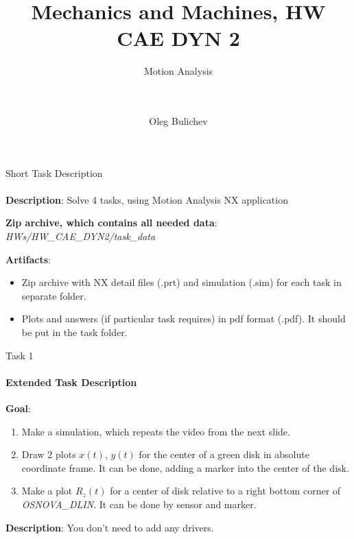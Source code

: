 \documentclass[aspectratio=169]{beamer}
\title[MaM]{Mechanics and Machines, HW CAE DYN 2} %
\subtitle{Motion Analysis
\\ \  \\ \ 
         } %
\author{Oleg Bulichev}
\newcommand{\fbckg}[1]{\usebackgroundtemplate{\texttt{[image: \#1]}}}%
\begin{document}
\setlength{\abovedisplayskip}{0pt}
\setlength{\belowdisplayskip}{0pt}
\setlength{\abovedisplayshortskip}{0pt}
\setlength{\belowdisplayshortskip}{0pt}

\fbckg{fibeamer/figs/title_page.png}

\fbckg{fibeamer/figs/common.png}

\note{\scriptsize \begin{itemize}
        \item \
    \end{itemize}}

\note{
    \
}

\begin{frame}[t]{Short Task Description}
    \framesubtitle{}
    \textbf{Description}: Solve 4 tasks, using Motion Analysis NX application

    \textbf{Zip archive, which contains all needed data}: \textit{HWs/HW\_CAE\_DYN2/task\_data}

    \textbf{Artifacts}:
    \begin{itemize}
        \item Zip archive with NX detail files (.prt) and simulation (.sim) for each task in separate folder.
        \item Plots and answers (if particular task requires) in pdf format (.pdf). It should be put in the task folder.
    \end{itemize}
\end{frame}

\begin{frame}[t]{Task 1}
    \framesubtitle{Extended Task Description}
    \textbf{Goal}: \begin{enumerate}
        \item Make a simulation, which repeats the video from the next slide.
        \item Draw 2 plots $x(t)$, $y(t)$ for the center of a green disk in absolute coordinate frame. It can be done, adding a marker into the center of the disk.
        \item Make a plot $R_z(t)$ for a center of disk relative to a right bottom corner of \textit{OSNOVA\_DLIN}. It can be done by sensor and marker.
    \end{enumerate}
    \smallskip

    \textbf{Description}: You don't need to add any drivers. 
\end{frame}
\end{document}
